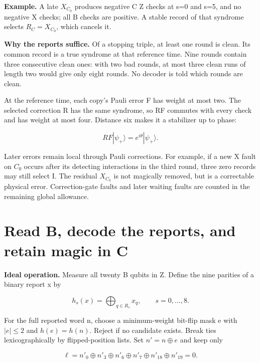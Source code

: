\documentclass[11pt]{article}
\begin{document}
\textbf{Example.} A late \(X_{C_0}\) produces negative C Z checks at s=0 and s=5, and no negative X checks; all B checks are positive. A stable record of that syndrome selects \(R_C=X_{C_0}\), which cancels it.

\textbf{Why the reports suffice.} Of a stopping triple, at least one round is clean. Its common record is a true syndrome at that reference time. Nine rounds contain three consecutive clean ones: with two bad rounds, at most three clean runs of length two would give only eight rounds. No decoder is told which rounds are clean.

At the reference time, each copy's Pauli error F has weight at most two. The selected correction R has the same syndrome, so RF commutes with every check and has weight at most four. Distance six makes it a stabilizer up to phase:

\[
RF|\psi_+\rangle=e^{i\theta}|\psi_+\rangle.
\]

Later errors remain local through Pauli corrections. For example, if a new X fault on \(C_0\) occurs after its detecting interactions in the third round, three zero records may still select I. The residual \(X_{C_0}\) is not magically removed, but is a correctable physical error. Correction-gate faults and later waiting faults are counted in the remaining global allowance.

\section{Read B, decode the reports, and retain magic in C}
\textbf{Ideal operation.} Measure all twenty B qubits in Z. Define the nine parities of a binary report x by

\[
h_s(x)=\bigoplus_{q\in R_s}x_q,\qquad s=0,\ldots,8.
\]

For the full reported word n, choose a minimum-weight bit-flip mask e with \(|e|\le2\) and \(h(e)=h(n)\). Reject if no candidate exists. Break ties lexicographically by flipped-position lists. Set \(n'=n\oplus e\) and keep only

\[
\ell=n'_0\oplus n'_3\oplus n'_6\oplus n'_7\oplus n'_{18}\oplus n'_{19}=0.
\]

\begin{center}\begin{minipage}{\linewidth}

\end{minipage}\end{center}
\end{document}
